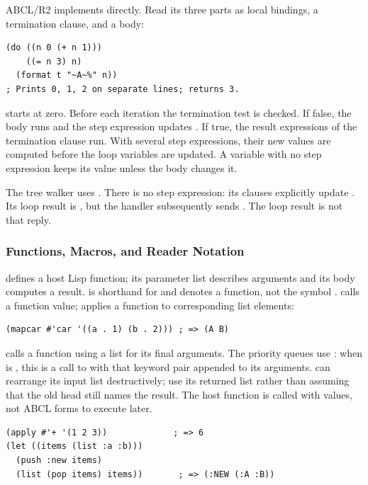 ABCL/R2 implements  directly. Read its three parts as local
bindings, a termination clause, and a body:
\begin{lstlisting}
(do ((n 0 (+ n 1)))
    ((= n 3) n)
  (format t "~A~%" n))
; Prints 0, 1, 2 on separate lines; returns 3.
\end{lstlisting}
 starts at zero. Before each iteration the termination test is
checked. If false, the body runs and the step expression updates .
If true, the result expressions of the termination clause run.
With several step expressions, their new values are computed before the
loop variables are updated. A variable with no step expression keeps its
value unless the body changes it.

The tree walker uses .
There is no step expression: its  clauses explicitly update
. Its loop result is , but the handler subsequently
sends . The loop result is not that reply.

\subsubsection{Functions, Macros, and Reader Notation}

 defines a host Lisp function; its parameter list describes
arguments and its body computes a result.
 is shorthand for  and denotes a function,
not the symbol .  calls a function value;
 applies a function to corresponding list elements:
\begin{lstlisting}
(mapcar #'car '((a . 1) (b . 2))) ; => (A B)
\end{lstlisting}
 calls a function using a list for its final arguments.
The priority queues use :
when  is , this is a call to
 with that keyword pair appended to its arguments.
 can rearrange its input list destructively; use its returned
list rather than assuming that the old head still names the result.
The host function is called with values, not ABCL forms to execute later.

\begin{lstlisting}
(apply #'+ '(1 2 3))             ; => 6
(let ((items (list :a :b)))
  (push :new items)
  (list (pop items) items))       ; => (:NEW (:A :B))
\end{lstlisting}

